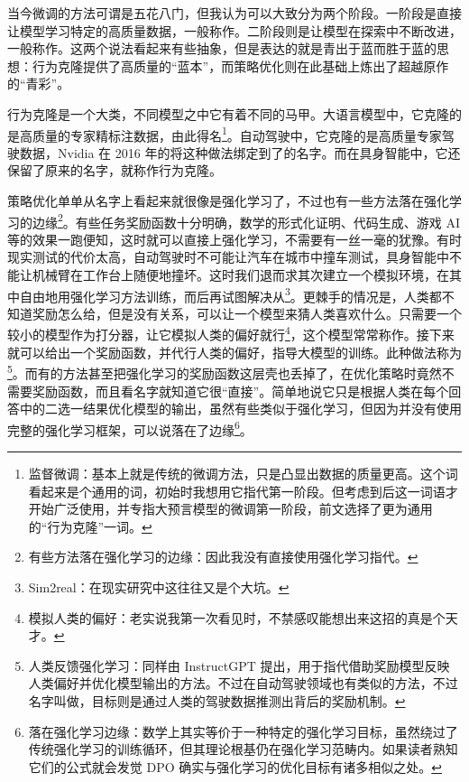 当今微调的方法可谓是五花八门，但我认为可以大致分为两个阶段。一阶段是直接让模型学习特定的高质量数据，一般称作。二阶段则是让模型在探索中不断改进，一般称作。这两个说法看起来有些抽象，但是表达的就是青出于蓝而胜于蓝的思想：行为克隆提供了高质量的“蓝本”，而策略优化则在此基础上炼出了超越原作的“青彩”。

行为克隆是一个大类，不同模型之中它有着不同的马甲。大语言模型中，它克隆的是高质量的专家精标注数据，由此得名\footnote{监督微调：基本上就是传统的微调方法，只是凸显出数据的质量更高。这个词看起来是个通用的词，初始时我想用它指代第一阶段。但考虑到后这一词语才开始广泛使用，并专指大预言模型的微调第一阶段，前文选择了更为通用的“行为克隆”一词。}。自动驾驶中，它克隆的是高质量专家驾驶数据，Nvidia 在 2016 年的将这种做法绑定到了的名字。而在具身智能中，它还保留了原来的名字，就称作行为克隆。

策略优化单单从名字上看起来就很像是强化学习了，不过也有一些方法落在强化学习的边缘\footnote{有些方法落在强化学习的边缘：因此我没有直接使用强化学习指代。}。有些任务奖励函数十分明确，数学的形式化证明、代码生成、游戏 AI 等的效果一跑便知，这时就可以直接上强化学习，不需要有一丝一毫的犹豫。有时现实测试的代价太高，自动驾驶时不可能让汽车在城市中撞车测试，具身智能中不能让机械臂在工作台上随便地撞坏。这时我们退而求其次建立一个模拟环境，在其中自由地用强化学习方法训练，而后再试图解决从\footnote{Sim2real：在现实研究中这往往又是个大坑。}。更棘手的情况是，人类都不知道奖励怎么给，但是没有关系，可以让一个模型来猜人类喜欢什么。只需要一个较小的模型作为打分器，让它模拟人类的偏好就行\footnote{模拟人类的偏好：老实说我第一次看见时，不禁感叹能想出来这招的真是个天才。}，这个模型常常称作。接下来就可以给出一个奖励函数，并代行人类的偏好，指导大模型的训练。此种做法称为\footnote{人类反馈强化学习：同样由 InstructGPT 提出，用于指代借助奖励模型反映人类偏好并优化模型输出的方法。不过在自动驾驶领域也有类似的方法，不过名字叫做，目标则是通过人类的驾驶数据推测出背后的奖励机制。}。而有的方法甚至把强化学习的奖励函数这层壳也丢掉了，在优化策略时竟然不需要奖励函数，而且看名字就知道它很“直接”。简单地说它只是根据人类在每个回答中的二选一结果优化模型的输出，虽然有些类似于强化学习，但因为并没有使用完整的强化学习框架，可以说落在了边缘\footnote{落在强化学习边缘：数学上其实等价于一种特定的强化学习目标，虽然绕过了传统强化学习的训练循环，但其理论根基仍在强化学习范畴内。如果读者熟知它们的公式就会发觉 DPO 确实与强化学习的优化目标有诸多相似之处。}。

